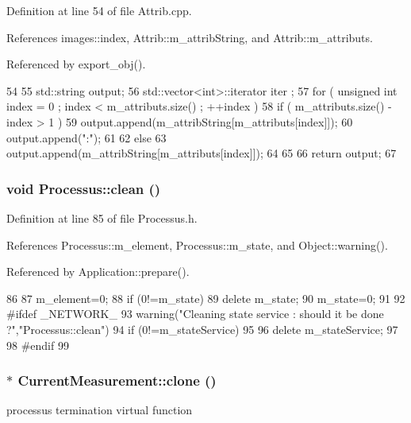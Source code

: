 Definition at line 54 of file Attrib.cpp.

References images::index, Attrib::m\_\-attribString, and Attrib::m\_\-attributs.

Referenced by export\_\-obj().


\begin{DoxyCode}
54                             {
55   std::string output;
56   std::vector<int>::iterator iter ;
57   for ( unsigned int index = 0 ; index < m_attributs.size() ; ++index ) {
58     if ( m_attributs.size() - index > 1 ) {
59       output.append(m_attribString[m_attributs[index]]);
60       output.append(":");
61     }
62     else {
63       output.append(m_attribString[m_attributs[index]]);
64     }
65   }
66   return output;
67 }
\end{DoxyCode}
\hypertarget{classProcessus_aaeb17673b98d2b39f3aa780e335e0968}{
\subsubsection[{clean}]{\setlength{\rightskip}{0pt plus 5cm}void Processus::clean ()}}
\label{classProcessus_aaeb17673b98d2b39f3aa780e335e0968}


Definition at line 85 of file Processus.h.

References Processus::m\_\-element, Processus::m\_\-state, and Object::warning().

Referenced by Application::prepare().


\begin{DoxyCode}
86   {
87     m_element=0;
88     if (0!=m_state) {
89       delete m_state;
90       m_state=0;
91     }
92 #ifdef _NETWORK_
93     warning("Cleaning state service : should it be done ?","Processus::clean")
94       if (0!=m_stateService)
95       {
96         delete m_stateService;
97       }
98 #endif
99   }
\end{DoxyCode}
\hypertarget{classCurrentMeasurement_a7722435fcc404fe4761c3fa96f3b6338}{
\subsubsection[{clone}]{$\ast$ CurrentMeasurement::clone ()}}
\label{classCurrentMeasurement_a7722435fcc404fe4761c3fa96f3b6338}
processus termination virtual function 

